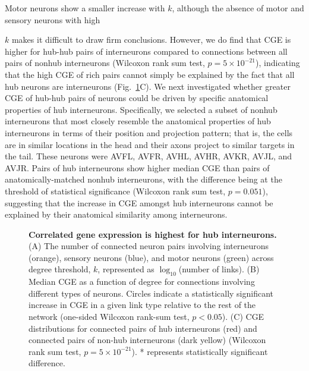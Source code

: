 \documentclass[10pt,letterpaper]{article}
\begin{document}
Motor neurons show a smaller increase with $k$, although the absence of motor and sensory neurons with high {$k$ makes it difficult to draw firm conclusions.
However, we do find that CGE is higher for hub-hub pairs of interneurons compared to connections between all pairs of nonhub interneurons (Wilcoxon rank sum test, $p = 5 \times 10^{-21}$), indicating that the high CGE of rich pairs cannot simply be explained by the fact that all hub neurons are interneurons (Fig.~\ref{fig:Fig7}C).
We next investigated whether greater CGE of hub-hub pairs of neurons could be driven by specific anatomical properties of hub interneurons.
Specifically, we selected a subset of nonhub interneurons that most closely resemble the anatomical properties of hub interneurons in terms of their position and projection pattern; that is, the cells are in similar locations in the head and their axons project to similar targets in the tail. These neurons were AVFL, AVFR, AVHL, AVHR, AVKR, AVJL, and AVJR.
Pairs of hub interneurons show higher median CGE than pairs of anatomically-matched nonhub interneurons, with the difference being at the threshold of statistical significance (Wilcoxon rank sum test, $p = 0.051$), suggesting that the increase in CGE amongst hub interneurons cannot be explained by their anatomical similarity among interneurons.

\begin{figure}[h]
\centering
 \caption{
\textbf{Correlated gene expression is highest for hub interneurons.}
(A) The number of connected neuron pairs involving interneurons (orange), sensory neurons (blue), and motor neurons (green) across degree threshold, $k$, represented as $\log_{10}$(number of links).
(B) Median CGE as a function of degree for connections involving different types of neurons.
Circles indicate a statistically significant increase in CGE in a given link type relative to the rest of the network (one-sided Wilcoxon rank-sum test, $p < 0.05$).
(C) CGE distributions for connected pairs of hub interneurons (red) and connected pairs of non-hub interneurons (dark yellow) (Wilcoxon rank sum test, $p = 5 \times 10^{-21}$). * represents statistically significant difference.
}
 \label{fig:Fig7}
\end{figure}

}
\end{document}
